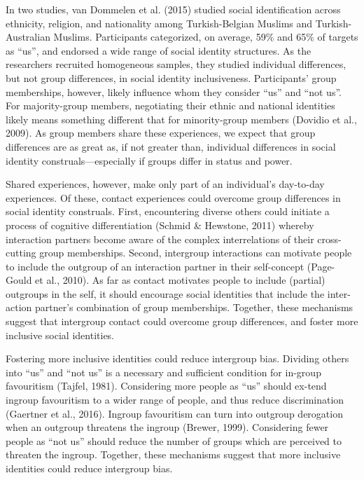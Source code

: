 \documentclass[12pt, a4paper]{article}
\begin{document}
In two studies, van Dommelen et al. (2015) studied social identification across ethnicity, religion, and nationality among Turkish-Belgian Muslims and Turkish-Australian Muslims. Participants categorized, on average, 59\% and 65\% of targets as ``us'', and endorsed a wide range of social identity structures. As the researchers recruited homogeneous samples, they studied individual differences, but not group differences, in social identity inclusiveness. Participants' group memberships, however, likely influence whom they consider ``us'' and ``not us''. For majority-group members, negotiating their ethnic and national identities likely means something different that for minority-group members (Dovidio et al., 2009). As group members share these experiences, we expect that group differences are as great as, if not greater than, individual differences in social identity construals---especially if groups differ in status and power.

Shared experiences, however, make only part of an individual's day-to-day experiences. Of these, contact experiences could overcome group differences in social identity construals. First, encountering diverse others could initiate a process of cognitive differentiation (Schmid \& Hewstone, 2011) whereby interaction partners become aware of the complex interrelations of their cross-cutting group memberships. Second, intergroup interactions can motivate people to include the outgroup of an interaction partner in their self-concept (Page-Gould et al., 2010). As far as contact motivates people to include (partial) outgroups in the self, it should encourage social identities that include the inter-action partner's combination of group memberships. Together, these mechanisms suggest that intergroup contact could overcome group differences, and foster more inclusive social identities.

Fostering more inclusive identities could reduce intergroup bias. Dividing others into “us'' and ``not us'' is a necessary and sufficient condition for in-group favouritism (Tajfel, 1981). Considering more people as ``us'' should ex-tend ingroup favouritism to a wider range of people, and thus reduce discrimination (Gaertner et al., 2016). Ingroup favouritism can turn into outgroup derogation when an outgroup threatens the ingroup (Brewer, 1999). Considering fewer people as ``not us'' should reduce the number of groups which are perceived to threaten the ingroup. Together, these mechanisms suggest that more inclusive identities could reduce intergroup bias.
\end{document}

